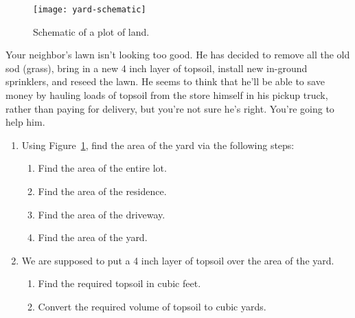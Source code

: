 \newpage

\begin{figure}[h]
  \centering
  \texttt{[image: yard-schematic]}
  \caption{Schematic of a plot of land.}%
  \label{fig:yard-schematic}
\end{figure}

\begin{exercise}
  Your neighbor's lawn isn't looking too good. He has decided to
  remove all the old sod (grass), bring in a new 4 inch layer of
  topsoil, install new in-ground sprinklers, and reseed the lawn. He
  seems to think that he'll be able to save money by hauling loads of
  topsoil from the store himself in his pickup truck, rather than
  paying for delivery, but you're not sure he's right. You're going to
  help him.
  \begin{enumerate}
  \item Using Figure~\ref{fig:yard-schematic}, find the area of the
    yard via the following steps:
    \begin{enumerate}
    \item Find the area of the entire lot.


    \item Find the area of the residence.


    \item Find the area of the driveway.


    \item Find the area of the yard.
    \end{enumerate}

    \newpage

  \item We are supposed to put a 4 inch layer of topsoil over the area
    of the yard.

    \begin{enumerate}
    \item Find the required topsoil in cubic feet.


    \item Convert the required volume of topsoil to cubic yards.


\end{enumerate}
\end{enumerate}
\end{exercise}
